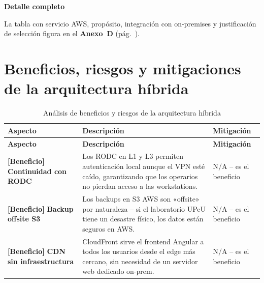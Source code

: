\documentclass[11pt, a4paper, oneside]{report}
\newenvironment{notabox}[1]{%
  \begin{lrbox}{\notaboxsb}%
  \begin{minipage}{\dimexpr\textwidth-2\fboxsep\relax}%
  \vspace{4pt}\textcolor{upeu_dark}{\textbf{#1}}\\[2pt]\small%
}{%
  \vspace{4pt}%
  \end{minipage}%
  \end{lrbox}%
  \vspace{6pt}\par\noindent\colorbox{upeu_light}{\usebox{\notaboxsb}}\par\vspace{6pt}%
}
\begin{document}
\begin{notabox}{Detalle completo}
La tabla con servicio AWS, propósito, integración con on-premises y justificación de selección figura en el \textbf{Anexo~D} (pág.~\pageref{anex:aws}).
\end{notabox}
\section{Beneficios, riesgos y mitigaciones de la arquitectura híbrida}

\renewcommand{\arraystretch}{1.3}
\footnotesize
{}

\begin{xltabular}{\textwidth}{@{}|L{2.8cm}|X|L{4cm}|@{}}
\caption{Análisis de beneficios y riesgos de la arquitectura híbrida}
\label{tab:beneficios_riesgos} \\

\parbox[c][1.1cm][c]{\linewidth}{\centering\color{white}\bfseries\small Aspecto} &
\parbox[c][1.1cm][c]{\linewidth}{\centering\color{white}\bfseries\small Descripción} &
\parbox[c][1.1cm][c]{\linewidth}{\centering\color{white}\bfseries\small Mitigación} \\ \hline
\endfirsthead

\parbox[c][1.1cm][c]{\linewidth}{\centering\color{white}\bfseries\small Aspecto} &
\parbox[c][1.1cm][c]{\linewidth}{\centering\color{white}\bfseries\small Descripción} &
\parbox[c][1.1cm][c]{\linewidth}{\centering\color{white}\bfseries\small Mitigación} \\ \hline
\endhead

\hline
\endfoot

{\small \textcolor{sev_bajo}{\textbf{[Beneficio]}} \textbf{Continuidad con RODC}} & {\small Los RODC en L1 y L3 permiten autenticación local aunque el VPN esté caído, garantizando que los operarios no pierdan acceso a las workstations.} & {\small N/A -- es el beneficio} \\ \hline

{\small \textcolor{sev_bajo}{\textbf{[Beneficio]}} \textbf{Backup offsite S3}} & {\small Los backups en S3 AWS son «offsite» por naturaleza -- si el laboratorio UPeU tiene un desastre físico, los datos están seguros en AWS.} & {\small N/A -- es el beneficio} \\ \hline

{\small \textcolor{sev_bajo}{\textbf{[Beneficio]}} \textbf{CDN sin infraestructura}} & {\small CloudFront sirve el frontend Angular a todos los usuarios desde el edge más cercano, sin necesidad de un servidor web dedicado on-prem.} & {\small N/A -- es el beneficio} \\ \hline


\end{xltabular}
\end{document}
